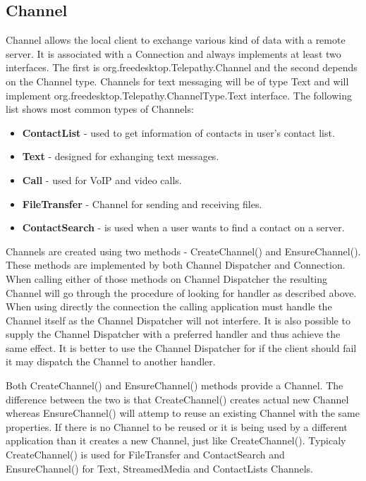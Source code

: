 \subsection*{Channel}
Channel allows the local client to exchange various kind of data with a remote server. It is associated with a Connection and always implements at least two interfaces. The first is org.freedesktop.Telepathy.Channel and the second depends on the Channel type. Channels for text messaging will be of type Text and will implement org.freedesktop.Telepathy.ChannelType.Text interface. The following list shows most common types of Channels\cite{TPWiki}:

\begin{itemize}

	\item {\bf ContactList} - used to get information of contacts in user's contact list.

	\item {\bf Text} - designed for exhanging text messages. 

	\item {\bf Call} - used for VoIP and video calls. 

	\item {\bf FileTransfer} - Channel for sending and receiving files.

	\item {\bf ContactSearch} - is used when a user wants to find a contact on a server.

\end{itemize}

Channels are created using two methods - CreateChannel() and EnsureChannel(). These methods are implemented by both Channel Dispatcher and Connection. When calling either of those methods on Channel Dispatcher the resulting Channel will go through the procedure of looking for handler as described above. When using directly the connection the calling application must handle the Channel itself as the Channel Dispatcher will not interfere. It is also possible to supply the Channel Dispatcher with a preferred handler and thus achieve the same effect. It is better to use the Channel Dispatcher for if the client should fail it may dispatch the Channel to another handler.\cite{TPWiki}

Both CreateChannel() and EnsureChannel() methods provide a Channel. The difference between the two is that CreateChannel() creates actual new Channel whereas EnsureChannel() will attemp to reuse an existing Channel with the same properties. If there is no Channel to be reused or it is being used by a different application than it creates a new Channel, just like CreateChannel(). Typicaly CreateChannel() is used for FileTransfer and ContactSearch and EnsureChannel() for Text, StreamedMedia and ContactLists Channels.\cite{TPWiki} 

